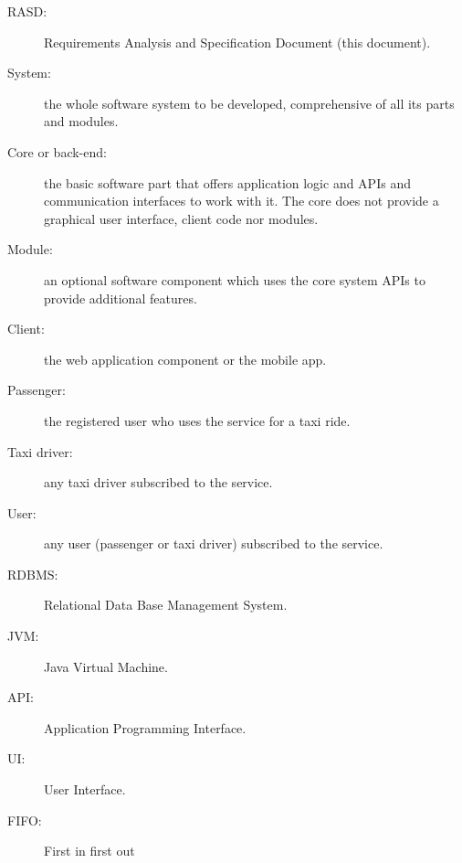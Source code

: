 \begin{description}
\item[RASD:] Requirements Analysis and Specification Document (this document).
\item[System:] the whole software system to be developed, comprehensive of all its parts and modules.
\item[Core or back-end:] the basic software part that offers application logic and APIs and communication interfaces to work with it. The core does not provide a graphical user interface, client code nor modules.
\item[Module:] an optional software component which uses the core system APIs to provide additional features.
\item[Client:] the web application component or the mobile app.
\item[Passenger:] the registered user who uses the service for a taxi ride.
\item[Taxi driver:] any taxi driver subscribed to the service.
\item[User:] any user (passenger or taxi driver) subscribed to the service.
\item[RDBMS:] Relational Data Base Management System.
\item[JVM:] Java Virtual Machine.
\item[API:] Application Programming Interface.
\item[UI:] User Interface.
\item[FIFO:] First in first out
\end{description}
